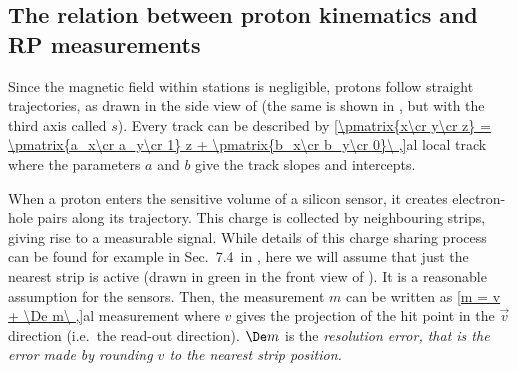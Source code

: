 \subsection[al psi]{The relation between proton kinematics and RP measurements}

Since the magnetic field within  stations is negligible, protons follow straight trajectories, as drawn in the side view of  (the same is shown in , but with the third axis called $s$). Every track can be described by
\eqref{\pmatrix{x\cr y\cr z} = \pmatrix{a_x\cr a_y\cr 1} z + \pmatrix{b_x\cr b_y\cr 0}\ ,}{al local track}
where the parameters $a$ and $b$ give the track slopes and intercepts.

When a proton enters the sensitive volume of a silicon sensor, it creates electron-hole pairs along its trajectory. This charge is collected by neighbouring strips, giving rise to a measurable signal. While details of this charge sharing process can be found for example in Sec.~7.4~in , here we will assume that just the nearest strip is active (drawn in green in the front view of ). It is a reasonable assumption for the  sensors. Then, the measurement $m$ can be written as
\eqref{m = v + \De m\ ,}{al measurement}
where $v$ gives the projection of the hit point in the $\vec v$ direction (i.e.~the read-out direction). $\De m$ is the \em{resolution error}, that is the error made by rounding $v$ to the nearest strip position.



